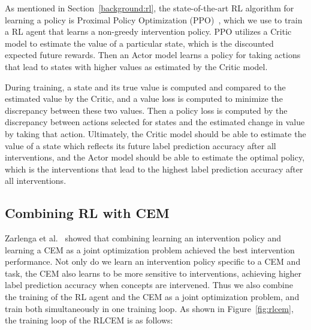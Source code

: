 As mentioned in Section~\ref{background:rl}, the state-of-the-art RL algorithm 
for learning
a policy is Proximal Policy Optimization (PPO)~\cite{ppo}, which we use
to train a RL agent that learns a non-greedy intervention policy.
PPO utilizes a Critic model to estimate
the value of a particular state, which is the discounted expected future rewards. Then
an Actor model learns a policy
for taking actions that lead to states with higher values as estimated by the
Critic model.

During training, a state and its true value is computed
and compared to the estimated value by the Critic, and a value loss is computed to minimize
the discrepancy between these two values. Then a policy loss is computed
by the discrepancy between actions selected for states and the estimated
change in value by taking that action.
Ultimately, the Critic model
should be able to estimate the value of a state which reflects
its future label prediction accuracy after all interventions,
and the Actor model should be able to estimate the optimal policy, 
which is the interventions that lead to the highest label prediction accuracy 
after all interventions.

\subsection{Combining RL with CEM}

Zarlenga et al.~\cite{intcem} showed that combining learning an intervention policy
and learning a CEM as a joint optimization problem achieved the best intervention performance.
Not only do we learn an intervention policy specific to a CEM and task, the 
CEM also learns to be more sensitive to interventions, achieving higher label prediction accuracy
when concepts are intervened. Thus we also combine the training of the RL agent and the CEM
as a joint optimization problem, and train
both simultaneously in one training loop.
As shown in Figure~\ref{fig:rlcem}, the training loop
of the RLCEM is as follows:

